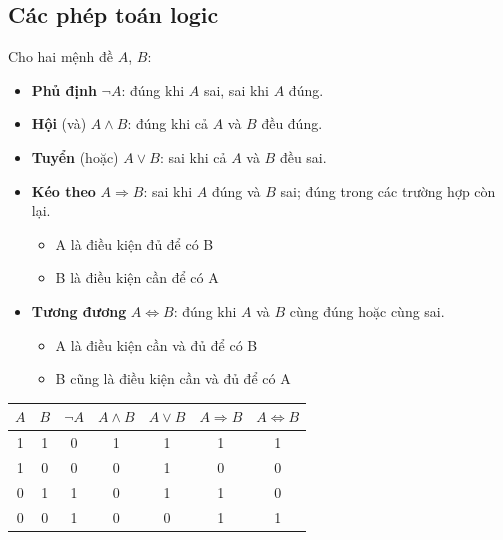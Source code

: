 \documentclass[12pt,a4paper]{article}
\begin{document}
\subsection{Các phép toán logic}

\begin{dinhnghia}
  Cho hai mệnh đề $A$, $B$:
  \begin{itemize}
    \item \textbf{Phủ định} $\neg A$: đúng khi $A$ sai, sai khi $A$ đúng.
    \item \textbf{Hội} (và) $A \wedge B$: đúng khi cả $A$ và $B$ đều đúng.
    \item \textbf{Tuyển} (hoặc) $A \vee B$: sai khi cả $A$ và $B$ đều sai.
    \item \textbf{Kéo theo} $A \Rightarrow B$: sai khi $A$ đúng và $B$ sai; đúng trong các trường hợp còn lại.
    \begin{itemize}
        \item A là điều kiện đủ để có B
        \item B là điều kiện cần để có A
    \end{itemize}
    \item \textbf{Tương đương} $A \Leftrightarrow B$: đúng khi $A$ và $B$ cùng đúng hoặc cùng sai.
    \begin{itemize}
        \item A là điều kiện cần và đủ để có B
        \item B cũng là điều kiện cần và đủ để có A
    \end{itemize}
  \end{itemize}
\end{dinhnghia}

\begin{congthuc}[title={Bảng chân lý}]
  \begin{center}
  \renewcommand{\arraystretch}{1.3}
  \begin{tabular}{|c|c||c|c|c|c|c|}
  \hline
  $A$ & $B$ & $\neg A$ & $A \wedge B$ & $A \vee B$ & $A \Rightarrow B$ & $A \Leftrightarrow B$ \\
  \hline
  1 & 1 & 0 & 1 & 1 & 1 & 1 \\
  1 & 0 & 0 & 0 & 1 & 0 & 0 \\
  0 & 1 & 1 & 0 & 1 & 1 & 0 \\
  0 & 0 & 1 & 0 & 0 & 1 & 1 \\
  \hline
  \end{tabular}
  \end{center}
\end{congthuc}
\end{document}
